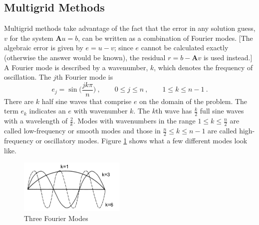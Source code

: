 \documentclass[12pt]{article}
\newcommand{\ve}[1]{\ensuremath{\mathbf{#1}}}
\begin{document}
\subsection*{Multigrid Methods}
Multigrid methods take advantage of the fact that the error in any solution guess, $v$ for the system $\ve{A}u=b$, can be written as a combination of Fourier modes. [The algebraic error is given by $e = u - v$; since $e$ cannot be calculated exactly (otherwise the answer would be known), the residual $r = b - \ve{A}v$ is used instead.] A Fourier mode is described by a wavenumber, $k$, which denotes the frequency of oscillation. The $j$th Fourier mode is 
% 
\begin{equation}
    e_{j} = \sin\bigl(\frac{jk\pi}{n}\bigr) \:, \qquad 0 \le j \le n \:, \qquad 1 \le k \le n-1 \:.
\end{equation} 
%
There are $k$ half sine waves that comprise $e$ on the domain of the problem. The term $e_{k}$ indicates an $e$ with wavenumber $k$. The $k$th wave has $\frac{k}{2}$ full sine waves with a wavelength of $\frac{2}{k}$. Modes with wavenumbers in the range $1 \le k \le \frac{n}{2}$ are called low-frequency or smooth modes and those in $\frac{n}{2} \le k \le n-1$ are called high-frequency or oscillatory modes. Figure \ref{fig:FourierModes} shows what a few different modes look like. 
%
\begin{figure}[!ht]
    \begin{center}
      \includegraphics [width=0.45\textwidth, height=0.2\textheight] {fig/FourierModes}
   \end{center}
   \caption{Three Fourier Modes}%
   \label{fig:FourierModes}
\end{figure}
\end{document}
